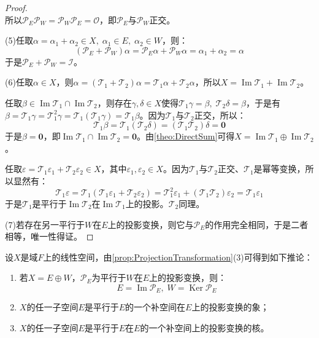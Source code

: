 \begin{proof}
\begin{equation*}
	\end{equation*}
	所以$\mathcal{P}_E\mathcal{P}_W=\mathcal{P}_W\mathcal{P}_E=\mathcal{O}$，即$\mathcal{P}_E$与$\mathcal{P}_W$正交。\par
	(5)任取$\alpha=\alpha_1+\alpha_2\in X,\;\alpha_1\in E,\;\alpha_2\in W$，则：
	\begin{equation*}
		(\mathcal{P}_E+\mathcal{P}_W)\alpha=\mathcal{P}_E\alpha+\mathcal{P}_W\alpha=\alpha_1+\alpha_2=\alpha
	\end{equation*}
	于是$\mathcal{P}_E+\mathcal{P}_W=\mathcal{I}$。\par
	(6)任取$\alpha\in X$，则$\alpha=(\mathcal{T}_1+\mathcal{T}_2)\alpha=\mathcal{T}_1\alpha+\mathcal{T}_2\alpha$，所以$X=\operatorname{Im}\mathcal{T}_1+\operatorname{Im}\mathcal{T}_2$。\par
	任取$\beta\in\operatorname{Im}\mathcal{T}_1\cap\operatorname{Im}\mathcal{T}_2$，则存在$\gamma,\delta\in X$使得$\mathcal{T}_1\gamma=\beta,\;\mathcal{T}_2\delta=\beta$，于是有$\beta=\mathcal{T}_1\gamma=\mathcal{T}_1^2\gamma=\mathcal{T}_1(\mathcal{T}_1\gamma)=\mathcal{T}_1\beta$。因为$\mathcal{T}_1$与$\mathcal{T}_2$正交，所以：
	\begin{equation*}
		\mathcal{T}_1\beta=\mathcal{T}_1(\mathcal{T}_2\delta)=(\mathcal{T}_1\mathcal{T}_2)\delta=\mathbf{0}
	\end{equation*}
	于是$\beta=\mathbf{0}$，即$\operatorname{Im}\mathcal{T}_1\cap\operatorname{Im}\mathcal{T}_2=\mathbf{0}$。由\cref{theo:DirectSum}可得$X=\operatorname{Im}\mathcal{T}_1\oplus\operatorname{Im}\mathcal{T}_2$。\par
	任取$\varepsilon=\mathcal{T}_1\varepsilon_1+\mathcal{T}_2\varepsilon_2\in X$，其中$\varepsilon_1,\varepsilon_2\in X$。因为$\mathcal{T}_1$与$\mathcal{T}_2$正交、$\mathcal{T}_1$是幂等变换，所以显然有：
	\begin{equation*}
		\mathcal{T}_1\varepsilon=\mathcal{T}_1(\mathcal{T}_1\varepsilon_1+\mathcal{T}_2\varepsilon_2)=\mathcal{T}_1^2\varepsilon_1+(\mathcal{T}_1\mathcal{T}_2)\varepsilon_2=\mathcal{T}_1\varepsilon_1
	\end{equation*}
	于是$\mathcal{T}_1$是平行于$\operatorname{Im}\mathcal{T}_2$在$\operatorname{Im}\mathcal{T}_1$上的投影。$\mathcal{T}_2$同理。\par
	(7)若存在另一平行于$W$在$E$上的投影变换，则它与$\mathcal{P}_E$的作用完全相同，于是二者相等，唯一性得证。
\end{proof}
\begin{corollary}
	设$X$是域$F$上的线性空间，由\cref{prop:ProjectionTransformation}(3)可得到如下推论：
	\begin{enumerate}
		\item 若$X=E\oplus W$，$\mathcal{P}_E$为平行于$W$在$E$上的投影变换，则：
		\begin{equation*}
			E=\operatorname{Im}\mathcal{P}_E,\;W=\operatorname{Ker}\mathcal{P}_E
		\end{equation*}
		\item $X$的任一子空间$E$是平行于$E$的一个补空间在$E$上的投影变换的象；
		\item $X$的任一子空间$E$是平行于$E$在$E$的一个补空间上的投影变换的核。
	\end{enumerate}
\end{corollary}
